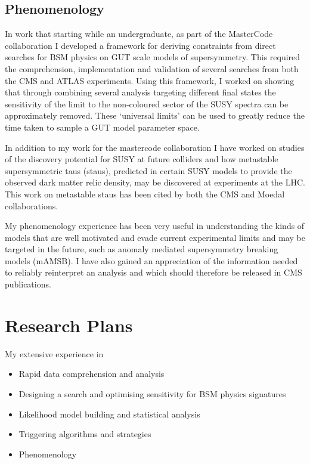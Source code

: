 \documentclass[11pt]{article}
\theoremstyle{plain} \numberwithin{equation}{section}
\theoremstyle{definition}
\begin{document}
\subsection*{Phenomenology}
In work that starting while an undergraduate, as part of the MasterCode collaboration I developed a framework for 
deriving constraints from direct searches for BSM physics on GUT scale models of supersymmetry. 
This required the comprehension, implementation and validation of several 
searches from both the CMS and ATLAS experiments. Using this framework, I worked on
showing that through combining several analysis targeting different final states the sensitivity of the 
limit to the non-coloured sector of the SUSY spectra can be approximately removed. 
These `universal limits' can be used to greatly reduce the 
time taken to sample a GUT model parameter space. 

In addition to my work for the mastercode collaboration I have worked on 
studies of the discovery potential for SUSY at future colliders and how 
metastable supersymmetric taus (staus), predicted in certain SUSY models to provide the observed
dark matter relic density, may be discovered at experiments at the LHC. 
This work on metastable staus has been cited by both the CMS and Moedal collaborations.

My phenomenology experience has been very useful in understanding
the kinds of models that are well motivated and evade current experimental limits and may be targeted in the 
future, such as anomaly mediated supersymmetry breaking models (mAMSB). I have also gained an appreciation
of the information needed to reliably reinterpret an analysis and which should therefore be released in CMS publications.

\section*{Research Plans}

My extensive experience in

\begin{itemize}
\item Rapid data comprehension and analysis
\item Designing a search and optimising sensitivity for BSM physics signatures
\item Likelihood model building and statistical analysis 
\item Triggering algorithms and strategies
\item Phenomenology
\end{itemize}
\end{document}
